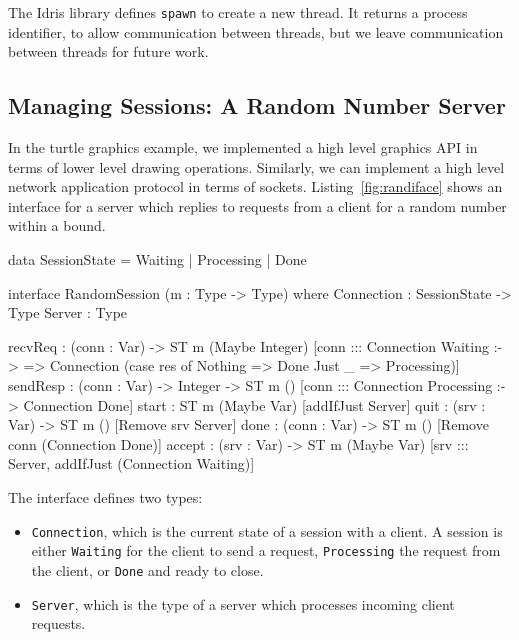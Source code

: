 The Idris library defines \texttt{spawn} to create a new thread. It
returns a process identifier, to allow communication between threads, but
we leave communication between threads for future work.

\subsection{Managing Sessions: A Random Number Server}

\label{sect:randserver}

In the turtle graphics example, we implemented a high level
graphics API in terms of lower level drawing operations. Similarly, we can
implement a high level network application protocol in terms of sockets.
Listing~\ref{fig:randiface} shows an interface for a server which replies
to requests from a client for a random number within a bound. 

\small
\begin{code}[float=h, frame=single,caption={An interface for a server which
returns random numbers within a given bound},
label=fig:randiface]
data SessionState = Waiting | Processing | Done

interface RandomSession (m : Type -> Type) where
  Connection : SessionState -> Type
  Server : Type

  recvReq : (conn : Var) ->
    ST m (Maybe Integer) [conn ::: Connection Waiting :->
                           \res => Connection (case res of
                                                    Nothing => Done
                                                    Just _ => Processing)]
  sendResp : (conn : Var) -> Integer ->
             ST m () [conn ::: Connection Processing :-> Connection Done]
  start : ST m (Maybe Var) [addIfJust Server]
  quit : (srv : Var) -> ST m () [Remove srv Server]
  done : (conn : Var) -> ST m () [Remove conn (Connection Done)]
  accept : (srv : Var) ->
           ST m (Maybe Var) [srv ::: Server, addIfJust (Connection Waiting)]
\end{code}
\normalsize

The interface defines two types:

\begin{itemize}
\item \texttt{Connection}, which is the current state of a session with
a client. A session is either \texttt{Waiting} for the client to send
a request, \texttt{Processing} the request from the client, or \texttt{Done}
and ready to close.
\item \texttt{Server}, which is the type of a server which processes
incoming client requests.
\end{itemize}

